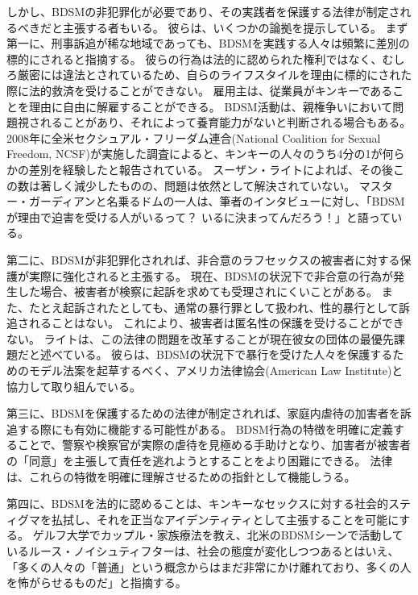 \documentclass[paper=a4,book,openany]{jlreq}
\begin{document}
しかし、BDSMの非犯罪化が必要であり、その実践者を保護する法律が制定されるべきだと主張する者もいる。
彼らは、いくつかの論拠を提示している。
まず第一に、刑事訴追が稀な地域であっても、BDSMを実践する人々は頻繁に差別の標的にされると指摘する。
彼らの行為は法的に認められた権利ではなく、むしろ厳密には違法とされているため、自らのライフスタイルを理由に標的にされた際に法的救済を受けることができない。
雇用主は、従業員がキンキーであることを理由に自由に解雇することができる\citep{keenan14:_can_you_reall}。
BDSM活動は、親権争いにおいて問題視されることがあり、それによって養育能力がないと判断される場合もある\citep{zavadski15:_paren_can_lose}。
2008年に全米セクシュアル・フリーダム連合(National Coalition for Sexual Freedom, NCSF)が実施した調査によると、キンキーの人々のうち4分の1が何らかの差別を経験したと報告されている\citep{sexual08:_secon_nation_survey_violen_discr}。
スーザン・ライトによれば、その後この数は著しく減少したものの、問題は依然として解決されていない。
マスター・ガーディアンと名乗るドムの一人は、筆者のインタビューに対し、「BDSMが理由で迫害を受ける人がいるって？ いるに決まってんだろう！」と語っている。

第二に、BDSMが非犯罪化されれば、非合意のラフセックスの被害者に対する保護が実際に強化されると主張する。
現在、BDSMの状況下で非合意の行為が発生した場合、被害者が検察に起訴を求めても受理されにくいことがある。
また、たとえ起訴されたとしても、通常の暴行罪として扱われ、性的暴行として訴追されることはない。
これにより、被害者は匿名性の保護を受けることができない。
ライトは、この法律の問題を改革することが現在彼女の団体の最優先課題だと述べている。
彼らは、BDSMの状況下で暴行を受けた人々を保護するためのモデル法案を起草するべく、アメリカ法律協会(American Law Institute)と協力して取り組んでいる\citep{mcarthur16:_its_traves_that_bdsm_isnt_techn_legal}。

第三に、BDSMを保護するための法律が制定されれば、家庭内虐待の加害者を訴追する際にも有効に機能する可能性がある。
BDSM行為の特徴を明確に定義することで、警察や検察官が実際の虐待を見極める手助けとなり、加害者が被害者の「同意」を主張して責任を逃れようとすることをより困難にできる。
法律は、これらの特徴を明確に理解させるための指針として機能しうる。

第四に、BDSMを法的に認めることは、キンキーなセックスに対する社会的スティグマを払拭し、それを正当なアイデンティティとして主張することを可能にする。
ゲルフ大学でカップル・家族療法を教え、北米のBDSMシーンで活動しているルース・ノイシュティフターは、社会の態度が変化しつつあるとはいえ、「多くの人々の「普通」という概念からはまだ非常にかけ離れており、多くの人を怖がらせるものだ」と指摘する\citep{mcarthur16:_its_traves_that_bdsm_isnt_techn_legal}。
\end{document}
